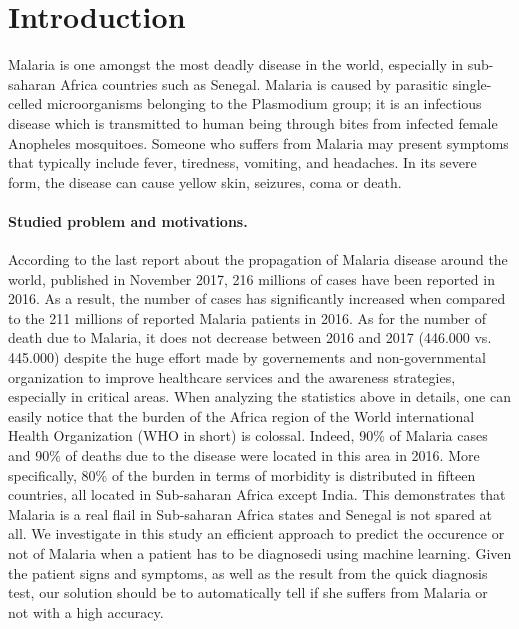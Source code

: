 \section{Introduction}\label{intro}
Malaria is one amongst the most deadly disease in the world, especially in sub-saharan Africa countries such as Senegal.
Malaria is caused by parasitic single-celled microorganisms belonging to the Plasmodium group; it is an infectious
disease which is transmitted to human being through bites from infected female Anopheles mosquitoes. Someone who suffers
from  Malaria may present symptoms that typically include fever, tiredness, vomiting, and headaches. In its severe form,
the disease can cause yellow skin, seizures, coma or death.

\paragraph*{Studied problem and motivations.}
According to the last report about the propagation of Malaria disease around the world, published in November 2017, 216 millions of cases have been 
reported in 2016. As a result, the number of cases has significantly increased when compared to the 211 millions of reported Malaria patients in 2016.
As for the number of death due to Malaria, it does not decrease between 2016 and 2017 (446.000 vs. 445.000) despite the huge effort made by governements
and non-governmental organization to improve healthcare services and the awareness strategies, especially in critical areas. 
When analyzing the statistics above in details, one can easily notice that the burden of the Africa region of the World 
international Health Organization (WHO in short) is colossal. Indeed, 90\% of Malaria cases and 90\% of deaths due to the disease were located in this area in 2016.
More specifically, 80\% of the burden in terms of morbidity is distributed in fifteen countries, all located in Sub-saharan Africa except India. This demonstrates
that Malaria is a real flail in Sub-saharan Africa states and Senegal is not spared at all. We investigate in this study an efficient approach to predict the occurence 
or not of Malaria when a patient has to be diagnosedi using machine learning. Given the patient signs and symptoms, as well as the result from the quick diagnosis test, our solution should be to 
automatically tell if she suffers from Malaria or not with a high accuracy.

